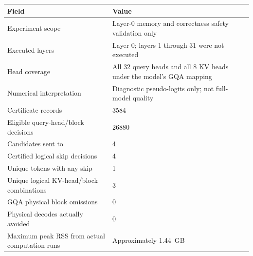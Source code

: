 \begin{threeparttable}
\begin{tabularx}{\linewidth}{@{}lX@{}}
\toprule
Field & Value \\
\midrule
Experiment scope & Layer-0 memory and correctness safety validation only \\
Executed layers & Layer 0; layers 1 through 31 were not executed \\
Head coverage & All 32 query heads and all 8 KV heads under the model's GQA mapping \\
Numerical interpretation & Diagnostic pseudo-logits only; not full-model quality \\
Certificate records & \num{3584} \\
Eligible query-head/block decisions & \num{26880} \\
Candidates sent to \mpfr{} & \num{4} \\
Certified logical skip decisions & \num{4} \\
Unique tokens with any skip & \num{1} \\
Unique logical KV-head/block combinations & \num{3} \\
GQA physical block omissions & \num{0} \\
Physical decodes actually avoided & \num{0} \\
Maximum peak RSS from actual computation runs & Approximately \num{1.44}~GB \\
\bottomrule
\end{tabularx}
\end{threeparttable}
